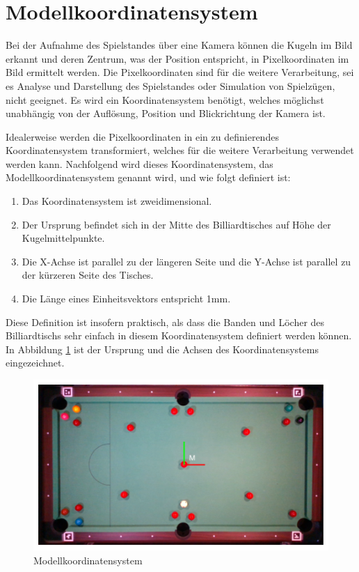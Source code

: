 \section{Modellkoordinatensystem}\label{kap:model_coordinate_system}

Bei der Aufnahme des Spielstandes über eine Kamera können die Kugeln im Bild erkannt und deren Zentrum, was der
Position entspricht, in Pixelkoordinaten im Bild ermittelt werden.
Die Pixelkoordinaten sind für die weitere Verarbeitung, sei es Analyse und Darstellung des Spielstandes oder Simulation
von Spielzügen, nicht geeignet. Es wird ein Koordinatensystem benötigt, welches möglichst unabhängig von der Auflösung,
Position und Blickrichtung der Kamera ist.

Idealerweise werden die Pixelkoordinaten in ein zu definierendes Koordinatensystem transformiert, welches für die weitere
Verarbeitung verwendet werden kann. Nachfolgend wird dieses Koordinatensystem, das Modellkoordinatensystem genannt wird,
und wie folgt definiert ist:
\begin{enumerate}
  \item Das Koordinatensystem ist zweidimensional.
  \item Der Ursprung befindet sich in der Mitte des Billiardtisches auf Höhe der Kugelmittelpunkte.
  \item Die X-Achse ist parallel zu der längeren Seite und die Y-Achse ist parallel zu der kürzeren Seite des Tisches.
  \item Die Länge eines Einheitsvektors entspricht 1\si{\milli\metre}.
\end{enumerate}

Diese Definition ist insofern praktisch, als dass die Banden und Löcher des Billiardtischs sehr einfach in diesem
Koordinatensystem definiert werden können.
In Abbildung \ref{fig:table_model_coordinate_system} ist der Ursprung und die Achsen des Koordinatensystems eingezeichnet.

\begin{figure}[h!]
    \begin{center}
    \includegraphics[width=0.8\linewidth]{../common/resources/coordinate_systems/table_model_coordinate_system.png}
    \end{center}
    \caption{Modellkoordinatensystem}
    \label{fig:table_model_coordinate_system}
\end{figure}

